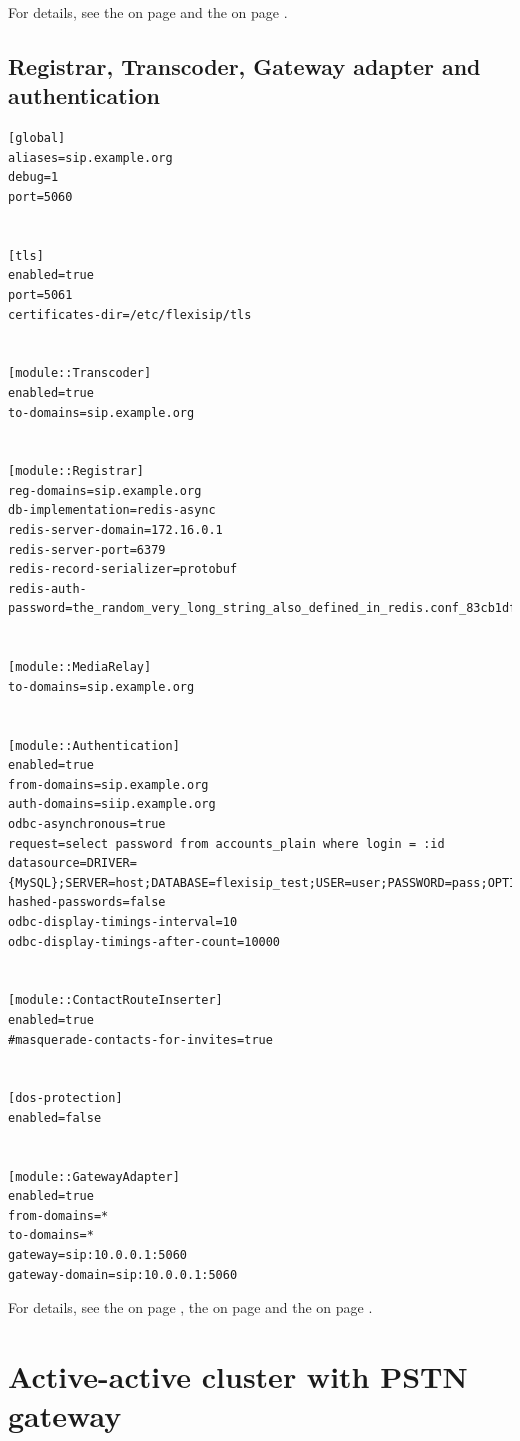 \documentclass[a4paper,10pt]{article}
\begin{document}
For details, see the  on page \pageref{module::Registrar}
and the  on page \pageref{module::Authentication}.



\subsection{Registrar, Transcoder, Gateway adapter and authentication}

\begin{verbatim} 
[global]
aliases=sip.example.org
debug=1
port=5060


[tls]
enabled=true
port=5061
certificates-dir=/etc/flexisip/tls


[module::Transcoder]
enabled=true
to-domains=sip.example.org


[module::Registrar]
reg-domains=sip.example.org
db-implementation=redis-async
redis-server-domain=172.16.0.1
redis-server-port=6379
redis-record-serializer=protobuf
redis-auth-password=the_random_very_long_string_also_defined_in_redis.conf_83cb1dfd2e3617


[module::MediaRelay]
to-domains=sip.example.org


[module::Authentication]
enabled=true
from-domains=sip.example.org
auth-domains=siip.example.org
odbc-asynchronous=true
request=select password from accounts_plain where login = :id
datasource=DRIVER={MySQL};SERVER=host;DATABASE=flexisip_test;USER=user;PASSWORD=pass;OPTION=3;
hashed-passwords=false
odbc-display-timings-interval=10
odbc-display-timings-after-count=10000


[module::ContactRouteInserter]
enabled=true
#masquerade-contacts-for-invites=true


[dos-protection]
enabled=false


[module::GatewayAdapter]
enabled=true
from-domains=*
to-domains=*
gateway=sip:10.0.0.1:5060
gateway-domain=sip:10.0.0.1:5060
\end{verbatim}


For details, see the  on page \pageref{module::Registrar},
the  on page \pageref{module::Authentication}
and the  on page \pageref{module::GatewayAdapter}.



\section{Active-active cluster with PSTN gateway}
\end{document}
